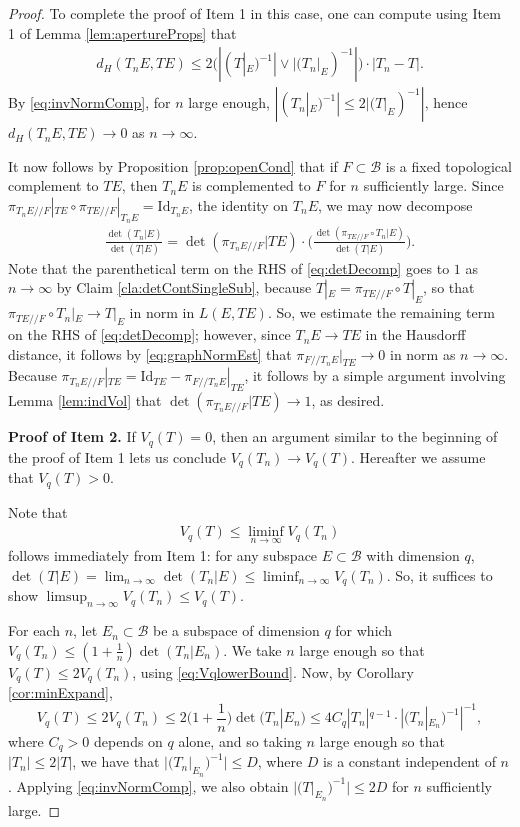 \documentclass[11pt]{amsart}
\theoremstyle{theorem}
\theoremstyle{definition}
\numberwithin{equation}{section}
\newcommand{\Id}{\text{Id}}
\newcommand{\Bc}{\mathcal{B}}
\newcommand{\ds}{/ \! /}
\begin{document}
\begin{proof}
To complete the proof of Item 1 in this case, one can compute using Item 1 of Lemma \ref{lem:apertureProps} that
\begin{align} \label{eq:imageSubComp}
d_H(T_n E, T E) \leq 2 \big( |(T|_E)^{-1}| \vee |(T_n|_E)^{-1}| \big) \cdot |T_n - T|.
\end{align}
By \eqref{eq:invNormComp}, for $n$ large enough, $|(T_n|_E)^{-1}| \leq 2 |(T|_E)^{-1}|$, hence $d_H(T_n E, T E) \to 0$ as $n \to \infty$.


It now follows by Proposition \ref{prop:openCond} that if $F \subset \Bc$ is a fixed topological complement to $T E$, then $T_n E$ is complemented to $F$ for $n$ sufficiently large. Since $\pi_{T_n E \ds F}|_{T E} \circ \pi_{T E \ds F}|_{T_n E} = \Id_{T_n E}$, the identity on $T_n E$, we may now decompose
\begin{align}\label{eq:detDecomp}
\frac{\det(T_n |E )}{\det(T | E)} = \det(\pi_{T_n E \ds F} | T E)\cdot  \bigg( \frac{ \det(\pi_{T E \ds F} \circ T_n | E) }{\det(T | E)} \bigg).
\end{align}
Note that the parenthetical term on the RHS of \eqref{eq:detDecomp} goes to $1$ as $n \to \infty$ by Claim \ref{cla:detContSingleSub}, because $T|_E = \pi_{T E \ds F} \circ T|_E$, so that $\pi_{T E \ds F} \circ T_n|_E \to T|_E$ in norm in $L(E, TE)$. So, we estimate the remaining term on the RHS of \eqref{eq:detDecomp}; however, since $T_n E \to T E$ in the Hausdorff distance, it follows by \eqref{eq:graphNormEst} that $\pi_{F \ds T_n E}|_{T E} \to 0$ in norm as $n \to \infty$. Because $\pi_{T_n E \ds F}|_{T E} = \Id_{T E} - \pi_{F \ds T_n E}|_{T E}$, it follows by a simple argument involving Lemma \ref{lem:indVol} that $\det(\pi_{T_n E \ds F} | T E) \to 1$, as desired.

\smallskip
{\bf Proof of Item 2.} If $V_q(T) = 0$, then an argument similar to the beginning of the proof of Item 1 lets us conclude $V_q(T_n) \to V_q(T)$. Hereafter we assume that $V_q(T) > 0$.

Note that 
\begin{align}\label{eq:VqlowerBound}
V_q(T) \leq \liminf_{n \to \infty} V_q(T_n)
\end{align}
follows immediately from Item 1: for any subspace $E \subset \Bc$ with dimension $q$, $\det(T | E) = \lim_{n \to \infty} \det(T_n | E) \leq \liminf_{n \to \infty} V_q(T_n)$. So, it suffices to show $\limsup_{n \to \infty} V_q(T_n) \leq V_q(T)$.

For each $n$, let $E_n \subset \Bc$ be a subspace of dimension $q$ for which $V_q(T_n) \leq (1 + \frac{1}{n} ) \det(T_n | E_n)$. We take $n$ large enough so that $V_q(T) \leq 2 V_q(T_n)$, using \eqref{eq:VqlowerBound}. Now, by Corollary \ref{cor:minExpand},
\[
V_q(T) \leq 2 V_q(T_n) \leq 2 \bigg(1 + \frac{1}{n} \bigg) \det(T_n | E_n) \leq 4 C_q |T_n|^{q-1} \cdot |(T_n |_{E_n})^{-1}|^{-1},
\]
where $C_q > 0$ depends on $q$ alone, and so taking $n$ large enough so that $|T_n| \leq 2 |T|$, we have that $|(T_n|_{E_n})^{-1}| \leq D$, where $D$ is a constant independent of $n$. Applying \eqref{eq:invNormComp}, we also obtain $|(T|_{E_n})^{-1}| \leq 2 D$ for $n$ sufficiently large.


\end{proof}
\end{document}
